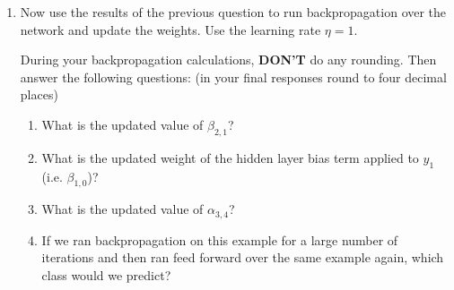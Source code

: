 \documentclass{article}
\theoremstyle{definition}
\theoremstyle{remark}
\newenvironment{Q_nosol}
{%
\clearpage
\item
}
{%
\phantom{s} %
\bigskip
}
\begin{document}
\begin{enumerate}[font={\Large\bfseries},left=0pt]
\begin{Q_nosol}
\begin{enumerate}
\begin{enumerate}
        \item Which class value we would predict on this training example?
        
        \begin{tcolorbox}

        \end{tcolorbox}
        

        \item What is the value of the total loss on this training example?
        
        \begin{tcolorbox}

        \end{tcolorbox}
        
    \end{enumerate}
    
    \clearpage
\item Now use the results of the previous question to run backpropagation over the network and update the weights. Use the learning rate $\eta=1$. 
    
    During your backpropagation calculations, \textbf{DON'T} do any rounding. Then answer the following questions: (in your final responses round to four decimal places)
    
     \begin{enumerate}
        \item What is the updated value of ${\beta}_{2,1}$?
        
        \begin{tcolorbox}

        \end{tcolorbox}
        
        
        \item What is the updated weight of the hidden layer bias term applied to $y_1$ (i.e. ${\beta}_{1,0}$)?
        
        \begin{tcolorbox}

        \end{tcolorbox}
        
        \item What is the updated value of ${\alpha}_{3,4}$?
        
        \begin{tcolorbox}

        \end{tcolorbox}
        
        
        \item If we ran backpropagation on this example for a large number of iterations and then ran feed forward over the same example again, which class would we predict?
        

\end{enumerate}
\end{enumerate}
\end{Q_nosol}
\end{enumerate}
\end{document}
